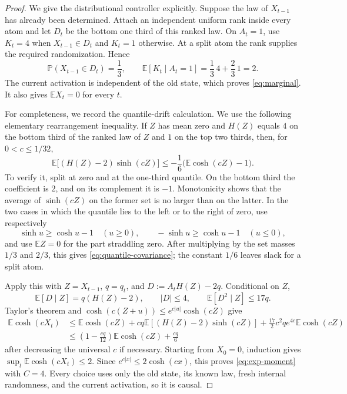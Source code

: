 \documentclass[11pt]{article}
\theoremstyle{remark}
\newcommand{\E}{\mathbb E}
\newcommand{\Pp}{\mathbb P}
\begin{document}
\begin{proof}
We give the distributional controller explicitly.  Suppose the law of
$X_{t-1}$ has already been determined.  Attach an independent uniform rank
inside every atom and let $D_t$ be the bottom one third of this ranked law.
On $A_t=1$, use $K_t=4$ when $X_{t-1}\in D_t$ and $K_t=1$ otherwise.  At a
split atom the rank supplies the required randomization.  Hence
\[
  \Pp(X_{t-1}\in D_t)=\frac13,
  \qquad \E[K_t\mid A_t=1]=\frac13\,4+\frac23\,1=2.
\]
The current activation is independent of the old state, which proves
\eqref{eq:marginal}.  It also gives $\E X_t=0$ for every $t$.

For completeness, we record the quantile-drift calculation.  We use the
following elementary rearrangement inequality.  If $Z$ has mean zero and
$H(Z)$ equals $4$ on the bottom third of the ranked law of $Z$ and $1$ on the
top two thirds, then, for $0<c\le1/32$,
\begin{equation}\label{eq:quantile-covariance}
 \E\bigl[(H(Z)-2)\sinh(cZ)\bigr]
 \le-\frac16\bigl(\E\cosh(cZ)-1\bigr).
\end{equation}
To verify it, split at zero and at the one-third quantile.  On the bottom
third the coefficient is $2$, and on its complement it is $-1$.
Monotonicity shows that the average of $\sinh(cZ)$ on the former set is no
larger than on the latter.  In the two cases in which the quantile lies to
the left or to the right of zero, use respectively
\[
 \sinh u\ge\cosh u-1\quad(u\ge0),
 \qquad
 -\sinh u\ge\cosh u-1\quad(u\le0),
\]
and use $\E Z=0$ for the part straddling zero.  After multiplying by the
set masses $1/3$ and $2/3$, this gives
\eqref{eq:quantile-covariance}; the constant $1/6$ leaves slack for a split
atom.

Apply this with $Z=X_{t-1}$, $q=q_t$, and
$D:=A_tH(Z)-2q$.  Conditional on $Z$,
\[
 \E[D\mid Z]=q(H(Z)-2),
 \qquad |D|\le4,
 \qquad \E[D^2\mid Z]\le17q.
\]
Taylor's theorem and
$\cosh(c(Z+u))\le e^{c|u|}\cosh(cZ)$ give
\begin{align*}
 \E\cosh(cX_t)
 &\le \E\cosh(cZ)
   +cq\E[(H(Z)-2)\sinh(cZ)]
   +\frac{17}{2}c^2qe^{4c}\E\cosh(cZ)\\
 &\le\left(1-\frac{cq}{12}\right)\E\cosh(cZ)
   +\frac{cq}{6}
\end{align*}
after decreasing the universal $c$ if necessary.  Starting from $X_0=0$,
induction gives $\sup_t\E\cosh(cX_t)\le2$.  Since
$e^{c|x|}\le2\cosh(cx)$, this proves \eqref{eq:exp-moment} with $C=4$.
Every choice uses only the old state, its known law, fresh internal
randomness, and the current activation, so it is causal.
\end{proof}
\end{document}
